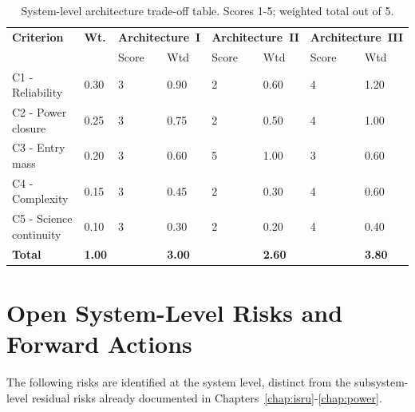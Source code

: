 \begin{table}[h!]
\centering
\caption{System-level architecture trade-off table. Scores 1-5; weighted total out of 5.}
\label{tab:arch_scores}
\renewcommand{\arraystretch}{1.25}
\begin{tabular}{p{2.4cm}p{1.0cm}p{1.6cm}p{1.6cm}p{1.6cm}p{1.6cm}p{1.6cm}p{1.6cm}}
\hline
\textbf{Criterion} & \textbf{Wt.} & \multicolumn{2}{c}{\textbf{Architecture~I}} & \multicolumn{2}{c}{\textbf{Architecture~II}} & \multicolumn{2}{c}{\textbf{Architecture~III}} \\
 & & Score & Wtd & Score & Wtd & Score & Wtd \\
\hline
C1 - Reliability & 0.30 & 3 & 0.90 & 2 & 0.60 & 4 & 1.20 \\
C2 - Power closure & 0.25 & 3 & 0.75 & 2 & 0.50 & 4 & 1.00 \\
C3 - Entry mass & 0.20 & 3 & 0.60 & 5 & 1.00 & 3 & 0.60 \\
C4 - Complexity & 0.15 & 3 & 0.45 & 2 & 0.30 & 4 & 0.60 \\
C5 - Science continuity & 0.10 & 3 & 0.30 & 2 & 0.20 & 4 & 0.40 \\
\hline
\textbf{Total} & \textbf{1.00} & & \textbf{3.00} & & \textbf{2.60} & & \textbf{3.80} \\
\hline
\end{tabular}
\end{table}



\section{Open System-Level Risks and Forward Actions}
\label{sec:system_risks}

The following risks are identified at the system level, distinct from the subsystem-level residual risks already documented in Chapters~\ref{chap:isru}-\ref{chap:power}.


